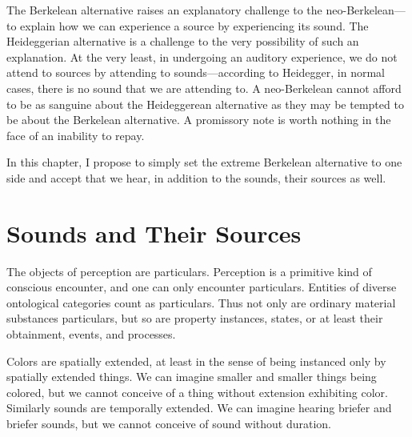 The Berkelean alternative raises an explanatory challenge to the neo-Berkelean---\-to explain how we can experience a source by experiencing its sound. The Heideggerian alternative is a challenge to the very possibility of such an explanation. At the very least, in undergoing an auditory experience, we do not attend to sources by attending to sounds---according to Heidegger, in normal cases, there is no sound that we are attending to. A neo-Berkelean cannot afford to be as sanguine about the Heideggerean alternative as they may be tempted to be about the Berkelean alternative. A promissory note is worth nothing in the face of an inability to repay.

In this chapter, I propose to simply set the extreme Berkelean alternative to one side and accept that we hear, in addition to the sounds, their sources as well. 


\section{Sounds and Their Sources} %
\label{sec:sounds_and_their_sources}

The objects of perception are particulars. Perception is a primitive kind of conscious encounter, and one can only encounter particulars. Entities of diverse ontological categories count as particulars. Thus not only are ordinary material substances particulars, but so are property instances, states, or at least their obtainment, events, and processes.

Colors are spatially extended, at least in the sense of being instanced only by spatially extended things. We can imagine smaller and smaller things being colored, but we cannot conceive of a thing without extension exhibiting color. Similarly sounds are temporally extended. We can imagine hearing briefer and briefer sounds, but we cannot conceive of sound without duration. 

